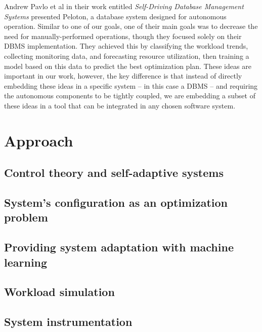 Andrew Pavlo et al in their work entitled \textit{Self-Driving Database Management Systems} presented Peloton, a database system designed for autonomous operation. Similar to one of our goals, one of their main goals was to decrease the need for manually-performed operations, though they focused solely on their DBMS implementation. They achieved this by classifying the workload trends, collecting monitoring data, and forecasting resource utilization, then training a model based on this data to predict the best optimization plan. These ideas are important in our work, however, the key difference is that instead of directly embedding these ideas in a specific system -- in this case a DBMS -- and requiring the autonomous components to be tightly coupled, we are embedding a subset of these ideas in a tool that can be integrated in any chosen software system. 




\section{Approach}

\subsection{Control theory and self-adaptive systems}

\subsection{System's configuration as an optimization problem}

\subsection{Providing system adaptation with machine learning}

\subsection{Workload simulation}

\subsection{System instrumentation}

